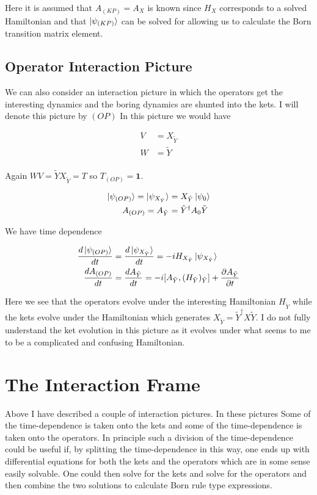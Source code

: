 \documentclass[12pt]{article}
\newcommand{\ddt}[1]{\frac{d #1}{dt}}
\newcommand{\ppt}[1]{\frac{\partial #1}{\partial t}}
\newcommand{\bv}[1]{\boldsymbol{#1}}
\begin{document}
Here it is assumed that $A_{(KP)} = A_X$ is known since $H_X$ corresponds to a solved Hamiltonian and that $\ket{\psi_{(KP)}}$ can be solved for allowing us to calculate the Born transition matrix element.

\subsection{Operator Interaction Picture}

We can also consider an interaction picture in which the operators get the interesting dynamics and the boring dynamics are shunted into the kets. I will denote this picture by $(OP)$ In this picture we would have

\begin{align}
V &= X_{\tilde{Y}}\\
W &= \tilde{Y}\\
\end{align}

Again $WV = \tilde{Y} X_{\tilde{Y}} = T$ so $T_{(OP)} = \bv{1}$.

\begin{align}
\ket{\psi_{(OP)}} = \ket{\psi_{X_{\tilde{Y}}}}&= X_{\tilde{Y}} \ket{\psi_0}\\
A_{(OP)} = A_{\tilde{Y}} &= \tilde{Y}^{\dag} A_0 \tilde{Y}
\end{align}

We have time dependence

\begin{align}
\ddt{\ket{\psi_{(OP)}}} &= \ddt{\ket{\psi_{X_{\tilde{Y}}}}} = -i H_{X_{\tilde{Y}}} \ket{\psi_{X_{\tilde{Y}}}}\\
\ddt{A_{(OP)}} &= \ddt{A_{\tilde{Y}}} =  -i[A_{\tilde{Y}}, (H_{\tilde{Y}})_{\tilde{Y}}] + \ppt{A_{\tilde{Y}}}\\
\end{align}

Here we see that the operators evolve under the interesting Hamiltonian $H_{\tilde{Y}}$ while the kets evolve under the Hamiltonian which generates $X_{\tilde{Y}} = \tilde{Y}^{\dag}X\tilde{Y}$. I do not fully understand the ket evolution in this picture as it evolves under what seems to me to be a complicated and confusing Hamiltonian.

\section{The Interaction Frame}

Above I have described a couple of interaction pictures. In these pictures Some of the time-dependence is taken onto the kets and some of the time-dependence is taken onto the operators. In principle such a division of the time-dependence could be useful if, by splitting the time-dependence in this way, one ends up with differential equations for both the kets and the operators which are in some sense easily solvable. One could then solve for the kets and solve for the operators and then combine the two solutions to calculate Born rule type expressions.
\end{document}
